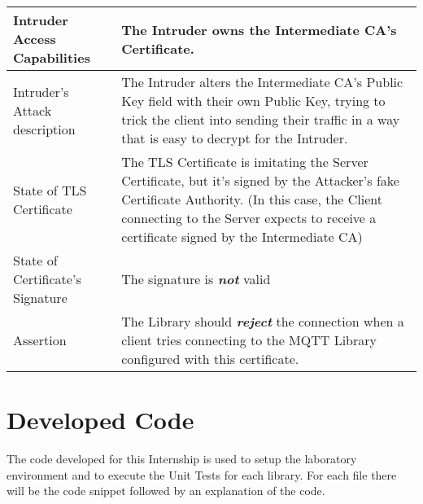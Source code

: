 \documentclass[binding=0.6cm,noexaminfo]{sapthesis}
\begin{document}
\begin{center}
\begin{tabular}{| p{6cm} | p{6cm} |}
\hline
Intruder Access Capabilities & The Intruder owns the Intermediate CA’s Certificate. \\
\hline
Intruder’s Attack description & The Intruder alters the Intermediate CA’s Public Key field with their own Public Key, trying to trick the client into sending their traffic in a way that is easy to decrypt for the Intruder. \\
\hline
State of TLS Certificate & The TLS Certificate is imitating the Server Certificate, but it’s signed by the Attacker’s fake Certificate Authority. (In this case, the Client connecting to the Server expects to receive a certificate signed by the Intermediate CA) \\
\hline
State of Certificate’s Signature & The signature is \textbf{\textit{not}} valid \\
\hline
Assertion & The Library should \textbf{\textit{reject}} the connection when a client tries connecting to the MQTT Library configured with this certificate. \\
\hline
\end{tabular}
\end{center}

\chapter{Developed Code}
The code developed for this Internship is used to setup the laboratory environment and to execute the Unit Tests for each library. For each file there will be the code snippet followed by an explanation of the code.
\end{document}

